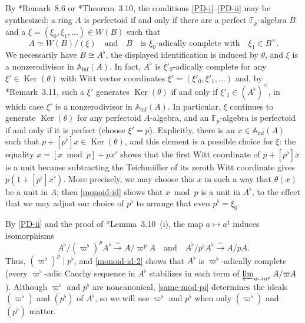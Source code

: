 \documentclass[11pt, reqno]{amsart}
\newcommand{\bA}{\mathbb{A}}
\newcommand{\bF}{\mathbb{F}}
\DeclareMathOperator{\Ker}{Ker}		%
\newcommand{\Inf}{\mathrm{inf}}		%
\newcommand{\isomto}{\overset{\sim}{\longrightarrow}}
\providecommand{\p}[1]{\left(#1\right)}
\providecommand{\qxq}[1]{\quad\text{#1}\quad}
\newcommand{\be}{\begin{equation}}
\newcommand{\ee}{\end{equation}}
\numberwithin{equation}{numberingbase}
\theoremstyle{thms}
\theoremstyle{claims}
\theoremstyle{defs}
\theoremstyle{thms}
\theoremstyle{defs}
\theoremstyle{subsection-tweak}
\theoremstyle{subsection-tweak}
\begin{document}
By \cite{Lau18}*{Remark~8.6} or \cite{BS19}*{Theorem~3.10}, the conditions \ref{PD-i}--\ref{PD-ii} may be synthesized: a ring $A$ is perfectoid if and only if there are a perfect $\bF_p$-algebra $B$ and a $\xi = (\xi_0, \xi_1,  \dotsc) \in W(B)$ such that %
\be \label{alt-def}
A  \simeq W(B)/(\xi) \qxq{and} B \qxq{is $\xi_0$-adically complete with} \xi_1 \in B^\times.
\ee 
We necessarily have $B \cong A^\flat$, the displayed identification is induced by $\theta$, and $\xi$ is a nonzerodivisor in $\bA_\Inf(A)$. In fact, $A^\flat$ is $\xi'_0$-adically complete for any $\xi' \in \Ker(\theta)$ with Witt vector coordinates $\xi' = (\xi'_0, \xi'_1, \dotsc)$ and, by \cite{BMS18}*{Remark~3.11}, such a $\xi'$ generates $\Ker(\theta)$ if and only if $\xi'_1 \in (A^\flat)^\times$, in which case $\xi'$ is a  nonzerodivisor in $\bA_\Inf(A)$.  In particular, $\xi$ continues to generate $\Ker(\theta)$ for any perfectoid $A$-algebra, and an $\bF_p$-algebra is perfectoid if and only if it is perfect (choose $\xi' = p$). Explicitly, there is an $x \in \bA_\Inf(A)$ such that $p + [p^\flat]x \in \Ker(\theta)$, and this element is a possible choice for $\xi$: the equality $x = [x \bmod p] + px'$ shows that the first Witt coordinate of $p + [p^\flat]x$ is a unit because subtracting the Teichm\"{u}ller of its zeroth Witt coordinate gives $p(1 + [p^\flat]x')$. More precisely, we may choose this  $x$ in such a way that $\theta(x)$ be a unit in $A$; then \eqref{monoid-id} shows that $x \bmod p$ is a unit in $A^\flat$, to the effect that we may adjust our choice of $p^\flat$ to arrange that even $p^\flat = \xi_0$. 


 


By \ref{PD-ii} and the proof of \cite{BMS18}*{Lemma~3.10~(i)}, the map $a \mapsto a^\sharp$ induces isomorphisms
\be \label{same-mod-pi}
A^\flat/(\varpi^\flat)^p A^\flat \isomto %
A/\varpi^p A  \qxq{and}  A^\flat/p^\flat A^\flat \isomto %
A/pA.
\ee
Thus, $(\varpi^\flat)^p \mid p^\flat$, and \eqref{monoid-id-2} shows that $A^\flat$ is $\varpi^\flat$-adically complete (every $\varpi^\flat$-adic Cauchy sequence in $A^\flat$ stabilizes in each term of $\varprojlim_{a \mapsto a^p} A/\varpi A$). 
Although $\varpi^\flat$ and $p^\flat$ are noncanonical, \eqref{same-mod-pi} determines the ideals $(\varpi^\flat)$ and $(p^\flat)$ of $A^\flat$, so we will use $\varpi^\flat$ and $p^\flat$ when only $(\varpi^\flat)$ and $(p^\flat)$ matter. 
\end{document}
